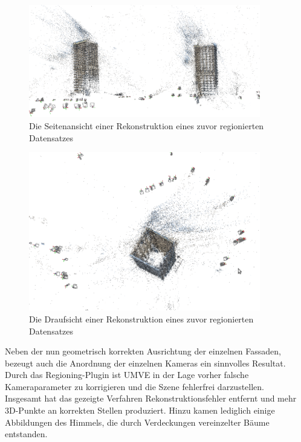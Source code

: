 \begin{figure}[h]
\centering
\includegraphics[width=0.9\textwidth]{gfx/Evaluation/finalPointcloud_AfE.png}
\caption[Die Seitenansicht einer Rekonstruktion eines zuvor regionierten Datensatzes]{Die Seitenansicht einer Rekonstruktion eines zuvor regionierten Datensatzes}
\label{gr:seitereg}
\end{figure}
\FloatBarrier

\begin{figure}[h]
\centering
\includegraphics[width=0.9\textwidth]{gfx/Evaluation/finalPointcloud_Top_AfE.png}
\caption[Die Draufsicht einer Rekonstruktion eines zuvor regionierten Datensatzes]{Die Draufsicht einer Rekonstruktion eines zuvor regionierten Datensatzes}
\label{gr:draufreg}
\end{figure}
\FloatBarrier

Neben der nun geometrisch korrekten Ausrichtung der einzelnen Fassaden, bezeugt auch die Anordnung der einzelnen Kameras ein sinnvolles Resultat. Durch das Regioning-Plugin ist UMVE in der Lage vorher falsche Kameraparameter zu korrigieren und die Szene fehlerfrei darzustellen.\\
Insgesamt hat das gezeigte Verfahren Rekonstruktionsfehler entfernt und mehr 3D-Punkte an korrekten Stellen produziert. Hinzu kamen lediglich einige Abbildungen des Himmels, die durch Verdeckungen vereinzelter B\"aume entstanden.

